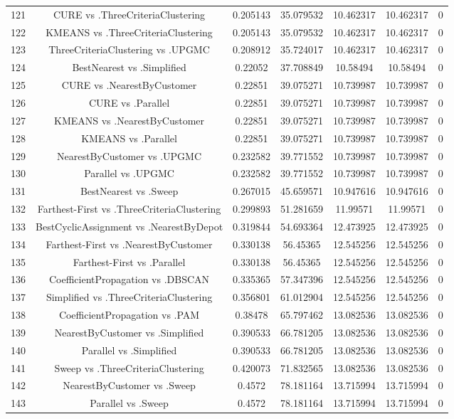 \documentclass[a4paper,10pt]{article}
\begin{document}
\begin{landscape}
\begin{table}[!htp]
\begin{tabular}{ccccccc}
121&CURE vs .ThreeCriteriaClustering&0.205143&35.079532&10.462317&10.462317&0\\
122&KMEANS vs .ThreeCriteriaClustering&0.205143&35.079532&10.462317&10.462317&0\\
123&ThreeCriteriaClustering vs .UPGMC&0.208912&35.724017&10.462317&10.462317&0\\
124&BestNearest vs .Simplified&0.22052&37.708849&10.58494&10.58494&0\\
125&CURE vs .NearestByCustomer&0.22851&39.075271&10.739987&10.739987&0\\
126&CURE vs .Parallel&0.22851&39.075271&10.739987&10.739987&0\\
127&KMEANS vs .NearestByCustomer&0.22851&39.075271&10.739987&10.739987&0\\
128&KMEANS vs .Parallel&0.22851&39.075271&10.739987&10.739987&0\\
129&NearestByCustomer vs .UPGMC&0.232582&39.771552&10.739987&10.739987&0\\
130&Parallel vs .UPGMC&0.232582&39.771552&10.739987&10.739987&0\\
131&BestNearest vs .Sweep&0.267015&45.659571&10.947616&10.947616&0\\
132&Farthest-First vs .ThreeCriteriaClustering&0.299893&51.281659&11.99571&11.99571&0\\
133&BestCyclicAssignment vs .NearestByDepot&0.319844&54.693364&12.473925&12.473925&0\\
134&Farthest-First vs .NearestByCustomer&0.330138&56.45365&12.545256&12.545256&0\\
135&Farthest-First vs .Parallel&0.330138&56.45365&12.545256&12.545256&0\\
136&CoefficientPropagation vs .DBSCAN&0.335365&57.347396&12.545256&12.545256&0\\
137&Simplified vs .ThreeCriteriaClustering&0.356801&61.012904&12.545256&12.545256&0\\
138&CoefficientPropagation vs .PAM&0.38478&65.797462&13.082536&13.082536&0\\
139&NearestByCustomer vs .Simplified&0.390533&66.781205&13.082536&13.082536&0\\
140&Parallel vs .Simplified&0.390533&66.781205&13.082536&13.082536&0\\
141&Sweep vs .ThreeCriteriaClustering&0.420073&71.832565&13.082536&13.082536&0\\
142&NearestByCustomer vs .Sweep&0.4572&78.181164&13.715994&13.715994&0\\
143&Parallel vs .Sweep&0.4572&78.181164&13.715994&13.715994&0\\

\end{tabular}
\end{table}
\end{landscape}
\end{document}
